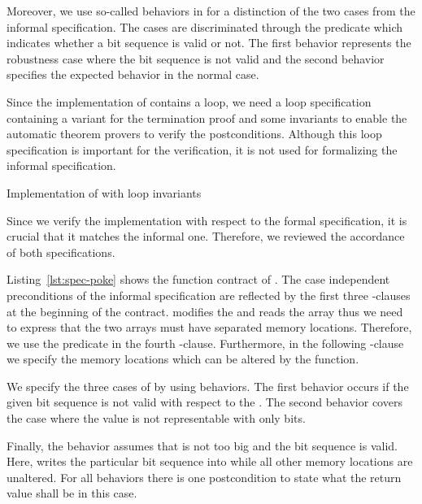Moreover, we use so-called behaviors in \acsl for a distinction of the two cases
from the informal specification.
The cases are discriminated through the predicate 
which indicates whether a bit sequence is valid or not.
The first behavior  represents the robustness 
case where the bit sequence is not valid and 
the second behavior specifies the expected behavior in the normal case.


Since the implementation of \peek contains a loop,
we need a loop specification containing a variant for the termination
proof and some invariants to enable the automatic theorem provers
to verify the postconditions.
Although this loop specification is important for the verification,
it is not used for formalizing the informal specification.

\begin{listing}[hbt]
\begin{minipage}{\textwidth}

\end{minipage}
\caption{\label{fig:spec-peek} Implementation of \peek with \acsl loop invariants}
\end{listing}

Since we verify the implementation with respect to the formal specification, 
it is crucial that it matches the informal one. 
Therefore, we reviewed the accordance of both specifications.

\clearpage

Listing~\ref{lst:spec-poke} shows the function contract of \poke.
The case independent preconditions of the informal specification 
are reflected by the  first three -clauses at the beginning of the contract.
\poke modifies the  and reads the array
 thus we need to express 
that the two arrays must have separated memory locations. 
Therefore, we use the predicate  in the fourth -clause.
Furthermore, in the following -clause we specify the memory locations which 
can be altered by the function.

We specify the three cases of \poke by using behaviors. 
The first behavior  occurs if the given bit sequence is not valid with respect to the . 
The second behavior  covers the case where the value  
is not representable with only  bits.

Finally, the behavior  assumes 
that  is not too big and the bit sequence is valid. 
Here, \poke writes the particular bit sequence into  
while all other memory locations are unaltered.
For all behaviors there is one postcondition to state what
the return value shall be in this case.



